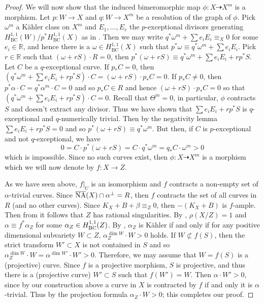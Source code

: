 \documentclass[12pt]{amsart}
\theoremstyle{plain}
\theoremstyle{remark}
\theoremstyle{definition}
\def\BC{\operatorname{BC}}
\newcommand{\<}{\leq}
\newcommand{\mbR}{\mathbb{R}}
\newcommand{\R}{{\mathbb{R}}}
\def\dim{\operatorname{dim}}
\theoremstyle{definition}
\theoremstyle{definition}
\numberwithin{equation}{section}
\theoremstyle{remark}
\begin{document}
\begin{proof}
We will now show that the induced bimeromorphic map $\phi: X\dasharrow X^m$ is a morphism. Let $p:W\to X$ and $q:W\to X^m$ be a resolution of the graph of $\phi$. Pick $\omega ^m$ a K\"ahler class on $X^m$ and $E_1,\ldots , E_r$ the $p$-exceptional divisors generating $H^{1,1}_{\BC}(W)/p^*H^{1,1}_{\BC}(X)$ as in \cite[Lemma 2.27]{DH20}. Then we may write $q^*\omega ^m+\sum e_iE_i\equiv _X0$ for some $e_i\in\mbR$, and hence there is a $\omega\in H^{1,1}_{\BC}(X)$ such that $p^*\omega \equiv q^*\omega ^m+\sum e_iE_i$. %
Pick $r\in \R$ such that $(\omega +rS)\cdot R=0$, then $p^*(\omega +rS)\equiv q^*\omega ^m+\sum e_iE_i+rp^*S$. Let $C$ be a $q$-exceptional curve. If $p_*C=0$, then $(q^*\omega ^m+\sum e_iE_i+rp^*S)\cdot C=(\omega+rS)\cdot p_*C=0$. If $p_*C\neq 0$, then 
$p^*\alpha \cdot C=q^*\alpha ^m\cdot C=0$ and so $p_*C\in R$ and hence $(\omega +rS)\cdot p_*C=0$ so that $(q^*\omega ^m+\sum e_iE_i+rp^*S)\cdot C=0$. Recall that $\Theta^m=0$, in particular, $\phi$ contracts $S$ and doesn't extract any divisor. Thus
we have shown that $\sum e_iE_i+rp^*S$ is  $q$-exceptional and $q$-numerically trivial. Then by the negativity lemma $\sum e_iE_i+rp^*S=0$ and so $p^*(\omega +rS)\equiv q^*\omega ^m$. But then, if $C$ is $p$-exceptional and not $q$-exceptional, we have
\[0=C\cdot p^*(\omega +rS)=C\cdot q^*\omega ^m=q_*C \cdot \omega ^m>0\]
which is impossible. Since no such curves exist, then $\phi: X\dasharrow X^m$ is a morphism which we will now denote by $f:X\to Z$.

As we have seen above, $f|_U$ is an isomorphism and $f$ contracts a non-empty set of $\alpha$-trivial curves. Since $\overline{\rm NA}(X)\cap \alpha ^\perp=R$, then $f$ contracts the set of all curves in $R$ (and no other curves).
Since $K_X+B+\beta \equiv _Z 0$, then
$-(K_X+B)$ is $f$-ample. Then from \cite[Lemma 2.41]{DH20} it follows that $Z$ has rational singularities.
By \cite[Lemma 3.3]{HP16}, $\rho (X/Z)=1$ and $\alpha \equiv f^* \alpha _Z$ for some $\alpha _Z\in H^{1,1}_{\rm BC}(Z)$. By \cite[Theorem 2.30]{DHP22}, $\alpha _Z$ is K\"ahler
if and only if for any positive dimensional subvariety  $W\subset Z$,  $\alpha _Z^{\dim W}\cdot W>0$ holds.
If $W\not \subset f(S)$, then the strict transform $W'\subset X$ is not contained in $S$ and so $\alpha _Z^{\dim W}\cdot W=\alpha ^{\dim W'}\cdot W'>0$. Therefore, we may assume that $W=f(S)$ is a (projective) curve. Since $f$ is a projective morphism, $S$ is projective, and thus there is a (projective curve) $W'\subset S$ such that $f(W')=W$. Then $\alpha\cdot W'>0$, since by our construction above a curve in $X$ is contracted by $f$ if and only it is $\alpha$-trivial. Thus by the projection formula $\alpha_Z\cdot W>0$; this completes our proof.

\end{proof}
\end{document}
